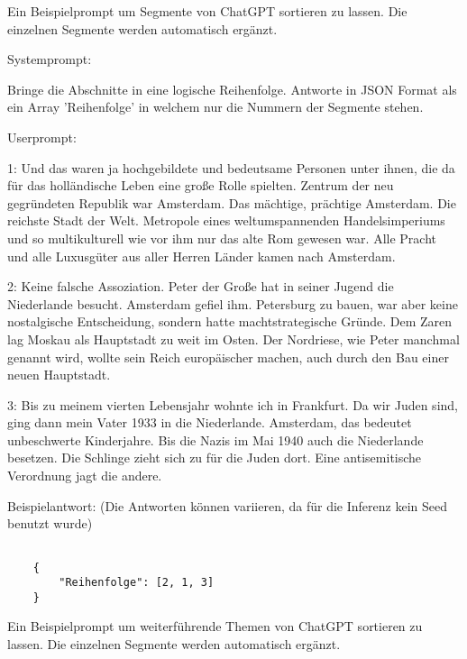 \label{ch:chatgpt-reranking}

Ein Beispielprompt um Segmente von ChatGPT sortieren zu lassen.
Die einzelnen Segmente werden automatisch ergänzt.

Systemprompt:
\begin{itshape}
    Bringe die Abschnitte in eine logische Reihenfolge.
    Antworte in JSON Format als ein Array 'Reihenfolge' in welchem nur die Nummern der Segmente stehen.
\end{itshape}

Userprompt:

\begin{itshape}
    1: Und das waren ja hochgebildete und bedeutsame Personen unter ihnen, die da für das holländische Leben eine große Rolle spielten. Zentrum der neu gegründeten Republik war Amsterdam. Das mächtige, prächtige Amsterdam. Die reichste Stadt der Welt. Metropole eines weltumspannenden Handelsimperiums und so multikulturell wie vor ihm nur das alte Rom gewesen war. Alle Pracht und alle Luxusgüter aus aller Herren Länder kamen nach Amsterdam.
    
    2: Keine falsche Assoziation. Peter der Große hat in seiner Jugend die Niederlande besucht. Amsterdam gefiel ihm. Petersburg zu bauen, war aber keine nostalgische Entscheidung, sondern hatte machtstrategische Gründe. Dem Zaren lag Moskau als Hauptstadt zu weit im Osten. Der Nordriese, wie Peter manchmal genannt wird, wollte sein Reich europäischer machen, auch durch den Bau einer neuen Hauptstadt.
    
    3: Bis zu meinem vierten Lebensjahr wohnte ich in Frankfurt. Da wir Juden sind, ging dann mein Vater 1933 in die Niederlande. Amsterdam, das bedeutet unbeschwerte Kinderjahre. Bis die Nazis im Mai 1940 auch die Niederlande besetzen. Die Schlinge zieht sich zu für die Juden dort. Eine antisemitische Verordnung jagt die andere.
\end{itshape}

Beispielantwort:
(Die Antworten können variieren, da für die Inferenz kein Seed benutzt wurde)

\begin{verbatim}

    {
        "Reihenfolge": [2, 1, 3]
    }

\end{verbatim}



\label{ch:chatgpt-topics}

Ein Beispielprompt um weiterführende Themen von ChatGPT sortieren zu lassen.
Die einzelnen Segmente werden automatisch ergänzt.

